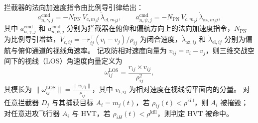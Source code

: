 拦截器的法向加速度指令由比例导引律给出：
\begin{equation}
a_{n,\gamma,j}^{\mathrm{cmd}}=-N_{\mathrm{PN}}\,V_{c,m_j j}\,\dot\lambda_{\mathrm{el},m_j j},\qquad
a_{n,\psi,j}^{\mathrm{cmd}}=-N_{\mathrm{PN}}\,V_{c,m_j j}\,\dot\lambda_{\mathrm{az},m_j j},
\label{eq:def-guid-pn}
\end{equation}
其中 $a_{n,\gamma,j}^{\mathrm{cmd}}$ 和 $a_{n,\psi,j}^{\mathrm{cmd}}$ 分别为拦截器在俯仰和偏航方向上的法向加速度指令，$N_{\mathrm{PN}}$ 为比例导引增益，$V_{c,ij}=-r_{ij}^\top(v_i-v_j)/\rho_{ij}$ 为闭合速度，$\dot\lambda_{\mathrm{az},ij}$ 和 $\dot\lambda_{\mathrm{el},ij}$ 分别为偏航与俯仰通道的视线角速率。
记攻防相对速度向量为 $v_{ij}=v_i-v_j$，则三维交战空间下的视线（LOS）角速度向量定义为
\begin{equation}
\omega_{ij}^{\mathrm{LOS}} = \frac{r_{ij}\times v_{ij}}{\rho_{ij}^2},
\label{eq:omega_ij_def}
\end{equation}
其模长为 $\|\omega_{ij}^{\mathrm{LOS}}\| = \frac{\|v_{t,ij}\|}{\rho_{ij}}$，其中 $v_{t,ij}$ 为相对速度在视线切平面内的分量。
对任意拦截器 $D_j$ 与其捕获目标 $A_i=m_j(t)$，若 $\rho_{ij}(t)<\rho^{\mathrm{kill}}$，则 $A_i$ 被摧毁；对任意进攻飞行器 $A_i$ 与 HVT，若 $\rho_{iH}(t)<\rho^{\mathrm{kill}}$，则判定 HVT 被命中。













